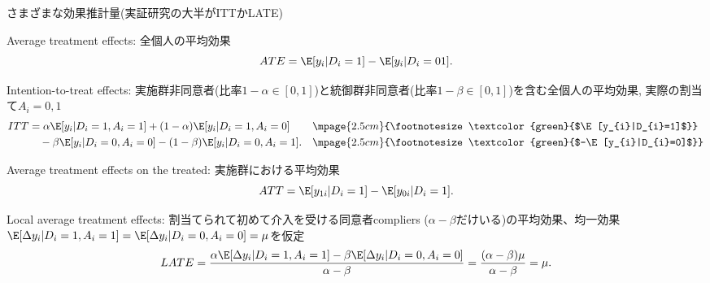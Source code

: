 \begin{frame}[label=ListOfEstimand, t]{}
さまざまな効果推計量(実証研究の大半がITTかLATE)
\begin{description}
\vspace{1.0ex}\setlength{\itemsep}{-1.0ex}\setlength{\baselineskip}{12pt}
\item[ATE]	Average treatment effects: 全個人の平均効果
\[
ATE = \E[y_{i}|D_{i}=1]-\E[y_{i}|D_{i}=01].
\]
\pause
\vspace{-1ex}
\item[ITT]	Intention-to-treat effects: 実施群非同意者(比率$1-\alpha\in[0, 1]$)と統御群非同意者(比率$1-\beta\in[0, 1]$)を含む全個人の平均効果, 実際の割当て$A_{i}=0, 1$
\[
\begin{aligned}
ITT
&= 
\alpha\E[y_{i}|D_{i}=1, A_{i}=1]+(1-\alpha)\E[y_{i}|D_{i}=1, A_{i}=0] \quad && \mpage{2.5cm}{\footnotesize \textcolor{green}{$\E[y_{i}|D_{i}=1]$}}\\
&\hspace{1em}-\beta\E[y_{i}|D_{i}=0, A_{i}=0]-(1-\beta)\E[y_{i}|D_{i}=0, A_{i}=1]. && \mpage{2.5cm}{\footnotesize \textcolor{green}{$-\E[y_{i}|D_{i}=0]$}}
\end{aligned}
\]
\pause
\vspace{-1ex}
\item[ATT]	Average treatment effects on the treated: 実施群における平均効果
\[
ATT = \E[y_{1i}|D_{i}=1]-\E[y_{0i}|D_{i}=1].
\]
\pause
\item[LATE]	Local average treatment effects: 割当てられて初めて介入を受ける同意者compliers ($\alpha-\beta$だけいる)の平均効果、均一効果$\E[\Delta y_{i}|D_{i}=1, A_{i}=1]=\E[\Delta y_{i}|D_{i}=0, A_{i}=0]=\mu$を仮定
\[
LATE = \frac{\alpha\E[\Delta y_{i}|D_{i}=1, A_{i}=1]-\beta\E[\Delta y_{i}|D_{i}=0, A_{i}=0]}{\alpha-\beta}
=
\frac{(\alpha-\beta)\mu}{\alpha-\beta}=\mu.
\]
\end{description}
\end{frame}



